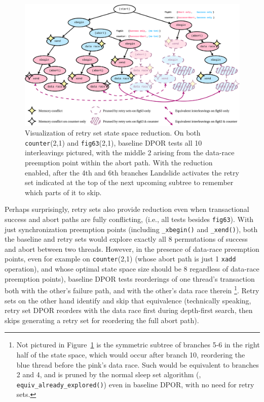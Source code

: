\begin{figure}[h]
	\begin{center}
		\includegraphics[width=\textwidth]{retry-sets.pdf}
	\end{center}
	\caption{Visualization of retry set state space reduction.
	On both {\tt counter}(2,1) and {\tt fig63}(2,1), baseline DPOR tests %
	all 10 interleavings pictured,
	with the middle 2 arising from the data-race preemption point within the abort path.
	With the reduction enabled,
	after the 4th and 6th branches Landslide activates the retry set
	indicated at the top of the next upcoming subtree
	to remember which parts of it to skip.
	}
	\label{fig:retry-reduction}
\end{figure}

Perhaps surprisingly, retry sets also provide reduction
even when transactional success and abort paths are fully conflicting,
(i.e., all tests besides {\tt fig63}).
With just synchronization preemption points (including {\tt \_xbegin()} and {\tt \_xend()}),
both the baseline and retry sets would explore exactly all 8 permutations of success and abort between two threads.
However, in the presence of data-race preemption points,
even for example on {\tt counter}(2,1)
(whose abort path is just 1 {\tt xadd} operation),
and whose optimal state space size should be 8 regardless of data-race preemption points),
baseline DPOR tests reorderings of one thread's transaction both with the other's failure path,
and with the other's data race therein%
\footnote{
Not pictured in Figure~\ref{fig:retry-reduction} is the symmetric subtree of branches 5-6 in the right half of the state space,
which would occur after branch 10, reordering the blue thread before the pink's data race.
Such would be equivalent to branches 2 and 4,
and is pruned by the normal sleep set algorithm (\sect{\ref{sec:landslide-sleepsets}}, {\tt equiv\_already\_explored()})
even in baseline DPOR, with no need for retry sets.
}.
Retry sets on the other hand identify and skip that equivalence
(technically speaking, retry set DPOR reorders with the data race first during depth-first search,
then skips generating a retry set for reordering the full abort path).

